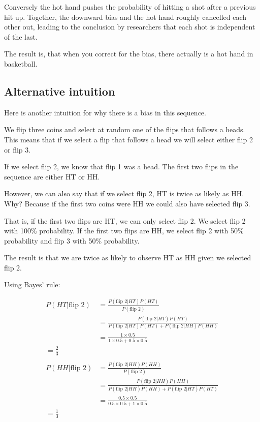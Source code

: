 \documentclass[
  letterpaper,
  DIV=11,
  numbers=noendperiod]{scrreprt}
\begin{document}
Conversely the hot hand pushes the probability of hitting a shot after a
previous hit up. Together, the downward bias and the hot hand roughly
cancelled each other out, leading to the conclusion by researchers that
each shot is independent of the last.

The result is, that when you correct for the bias, there actually is a
hot hand in basketball.

\hypertarget{alternative-intuition}{%
\subsection{Alternative intuition}\label{alternative-intuition}}

Here is another intuition for why there is a bias in this sequence.

We flip three coins and select at random one of the flips that follows a
heads. This means that if we select a flip that follows a head we will
select either flip 2 or flip 3.

If we select flip 2, we know that flip 1 was a head. The first two flips
in the sequence are either HT or HH.

However, we can also say that if we select flip 2, HT is twice as likely
as HH. Why? Because if the first two coins were HH we could also have
selected flip 3.

That is, if the first two flips are HT, we can only select flip 2. We
select flip 2 with 100\% probability. If the first two flips are HH, we
select flip 2 with 50\% probability and flip 3 with 50\% probability.

The result is that we are twice as likely to observe HT as HH given we
selected flip 2.

Using Bayes' rule:

\begin{align*}
P(HT|\text{flip 2})&=\frac{P(\text{flip 2}|HT)P(HT)}{P(\text{flip 2})} \\[6pt]
&=\frac{P(\text{flip 2}|HT)P(HT)}{P(\text{flip 2}|HT)P(HT)+P(\text{flip 2}|HH)P(HH)} \\[6pt]
&=\frac{1\times 0.5}{1\times 0.5+0.5\times 0.5} \\[6pt]
=\frac{2}{3} \\[6pt]
\\
P(HH|\text{flip 2})&=\frac{P(\text{flip 2}|HH)P(HH)}{P(\text{flip 2})} \\[6pt]
&=\frac{P(\text{flip 2}|HH)P(HH)}{P(\text{flip 2}|HH)P(HH)+P(\text{flip 2}|HT)P(HT)} \\[6pt]
&=\frac{0.5\times 0.5}{0.5\times 0.5+1\times 0.5} \\[6pt]
=\frac{1}{3} \\[6pt]
\end{align*}
\end{document}
